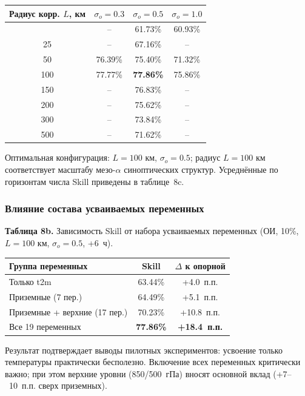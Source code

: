 \documentclass[14pt,a4paper]{extarticle}
\newcounter{none}
\numberwithin{table}{section}
\numberwithin{figure}{section}
\numberwithin{equation}{section}
\begin{document}
{\def\LTcaptype{none}
\begin{longtable}[]{@{}cccc@{}}
\toprule\noalign{}
Радиус корр. $L$, км & $\sigma_o = 0.3$ & $\sigma_o = 0.5$ & $\sigma_o = 1.0$ \\
\midrule\noalign{}
\endhead
\bottomrule\noalign{}
\endlastfoot
10 & -- & 61.73\% & 60.93\% \\
25 & -- & 67.16\% & -- \\
50 & 76.39\% & 75.40\% & 71.32\% \\
100 & 77.77\% & \textbf{77.86\%} & 75.86\% \\
150 & -- & 76.83\% & -- \\
200 & -- & 75.62\% & -- \\
300 & -- & 73.84\% & -- \\
500 & -- & 71.62\% & -- \\
\end{longtable}
}

Оптимальная конфигурация: \(L = 100\) км, \(\sigma_o = 0.5\); радиус
\(L = 100\) км соответствует масштабу мезо-\(\alpha\) синоптических
структур. Усреднённые по горизонтам числа Skill приведены в
таблице~8c.

\subsubsection{Влияние состава усваиваемых переменных}

\textbf{Таблица 8b.} Зависимость Skill от набора усваиваемых переменных
(ОИ, 10\%, \(L = 100\) км, \(\sigma_o = 0.5\), +6~ч).

{\def\LTcaptype{none}
\begin{longtable}[]{@{}lcc@{}}
\toprule\noalign{}
Группа переменных & Skill & $\Delta$ к опорной \\
\midrule\noalign{}
\endhead
\bottomrule\noalign{}
\endlastfoot
Только t2m & 63.44\% & +4.0~п.п. \\
Приземные (7 пер.) & 64.49\% & +5.1~п.п. \\
Приземные + верхние (17 пер.) & 70.23\% & +10.8~п.п. \\
Все 19 переменных & \textbf{77.86\%} & \textbf{+18.4~п.п.} \\
\end{longtable}
}

Результат подтверждает выводы пилотных экспериментов:
усвоение только температуры практически бесполезно. Включение всех
переменных критически важно; при этом верхние уровни (850/500~гПа)
вносят основной вклад (+7– 10~п.п. сверх приземных).
\end{document}
